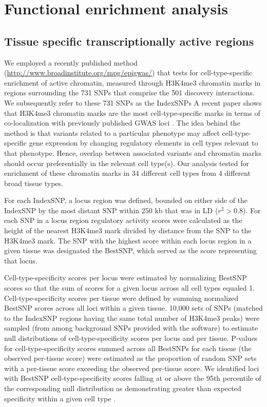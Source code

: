 \documentclass{article}
\begin{document}
\section{Functional enrichment analysis}

\subsection{Tissue specific transcriptionally active regions}

We employed a recently published method (\url{http://www.broadinstitute.org/mpg/epigwas/}) \cite{Trynka2013} that tests for cell-type-specific enrichment of active chromatin, measured through H3K4me3 chromatin marks \cite{Koch2007} in regions surrounding the 731 SNPs that comprise the 501 discovery interactions. We subsequently refer to these 731 SNPs as the IndexSNPs A recent paper shows that H3K4me3 chromatin marks are the most cell-type-specific marks in terms of co-localization with previously published GWAS loci \cite{Trynka2013}. The idea behind the method is that variants related to a particular phenotype may affect cell-type-specific gene expression by changing regulatory elements in cell types relevant to that phenotype. Hence, overlap between associated variants and chromatin marks should occur preferentially in the relevant cell type(s). Our analysis tested for enrichment of these chromatin marks in 34 different cell types from 4 different broad tissue types.

For each IndexSNP, a locus region was defined, bounded on either side of the IndexSNP by the most distant SNP within 250 kb that was in LD ($r^{2} > 0.8$). For each SNP in a locus region regulatory activity scores were calculated as the height of the nearest H3K4me3 mark divided by distance from the SNP to the H3K4me3 mark. The SNP with the highest score within each locus region in a given tissue was designated the BestSNP, which served as the score representing that locus.

Cell-type-specificity scores per locus were estimated by normalizing BestSNP scores so that the sum of scores for a given locus across all cell types equaled 1. Cell-type-specificity scores per tissue were defined by summing normalized BestSNP scores across all loci within a given tissue. 10,000 sets of SNPs (matched to the IndexSNP regions having the same total number of H3K4me3 peaks) were sampled (from among background SNPs provided with the software) to estimate null distributions of cell-type-specificity scores per locus and per tissue. P-values for cell-type-specificity scores summed across all BestSNPs for each tissue (the observed per-tissue score) were estimated as the proportion of random SNP sets with a per-tissue score exceeding the observed per-tissue score. We identified loci with BestSNP cell-type-specificity scores falling at or above the 95th percentile of the corresponding null distribution as demonstrating greater than expected specificity within a given cell type \cite{Trynka2013}.
\end{document}
